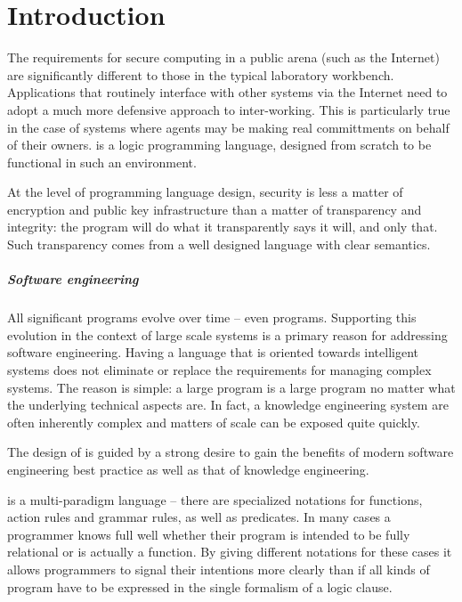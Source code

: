 \chapter{Introduction}
The requirements for secure computing in a public arena (such as the Internet) are significantly different to those in the typical laboratory workbench. Applications that routinely interface with other systems via the Internet need to adopt a much more defensive approach to inter-working. This is particularly true in the case of systems where agents may be making real committments on behalf of their owners.  \go is a logic programming language, designed from scratch to be functional in such an environment.

At the level of programming language design, security is less a matter of encryption and public key infrastructure than a matter of transparency and integrity: the program will do what it transparently says it will, and only that. Such transparency comes from a well designed language with clear semantics. 

\paragraph{Software engineering}
All significant programs evolve over time -- even \go programs. Supporting this evolution in the context of large scale systems is a primary reason for addressing software engineering. Having a language that is oriented towards intelligent systems does not eliminate or replace the requirements for managing complex systems. The reason is simple: a large program is a large program no matter what the underlying technical aspects are. In fact, a knowledge engineering system are often inherently complex and matters of scale can be exposed quite quickly.

The design of \go is guided by a strong desire to gain the benefits of modern software engineering best practice as well as that of knowledge engineering. 

\go is a multi-paradigm language -- there are specialized notations for  functions, action rules and grammar rules, as well as predicates. In many cases a programmer knows full well whether their program is intended to be fully relational or is actually a function. By giving different notations for these cases it allows programmers to signal their intentions more clearly than if all kinds of program have to be expressed in the single formalism of a logic clause.


